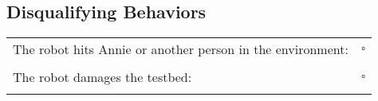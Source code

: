 \subsection*{Disqualifying Behaviors}
\begin{tabular}{ l c}

The robot hits Annie or another person in the environment: & $\square$ \\ \\

The robot damages the testbed: & $\square$ \\ \\

\end{tabular}

